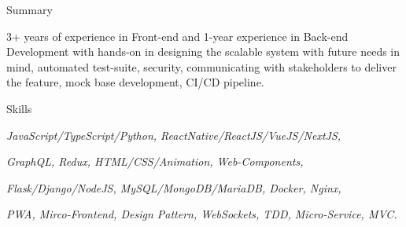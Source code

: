 \documentclass{resume} %
\begin{document}

\begin{rSection}{Summary}
  \begin{rSummarySection}
  {
    \item 3+ years of experience in Front-end and 1-year experience in Back-end Development with hands-on in designing the scalable system with future needs in mind, automated test-suite, security, communicating with stakeholders to deliver the feature, mock base development, CI/CD pipeline.
  }
  \end{rSummarySection}
\end{rSection}


\begin{rSection}{Skills}
  \begin{rSummarySection}
  {
    \item {\it JavaScript/TypeScript/Python, ReactNative/ReactJS/VueJS/NextJS,} 
    \item {\it GraphQL, Redux, HTML/CSS/Animation, Web-Components,}
    \item {\it Flask/Django/NodeJS, MySQL/MongoDB/MariaDB, Docker, Nginx,}
    \item {\it PWA, Mirco-Frontend, Design Pattern, WebSockets, TDD, Micro-Service, MVC.}
  }
  \end{rSummarySection}
\end{rSection}

\end{document}
